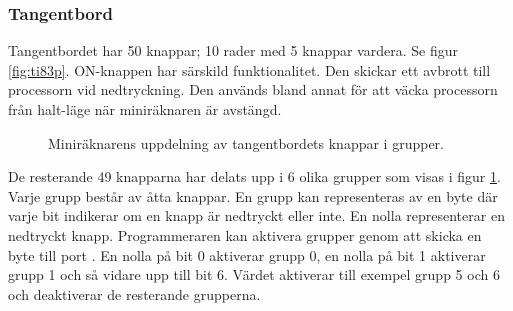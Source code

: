 \documentclass[main.tex]{subfiles}
\begin{document}
\subsubsection{Tangentbord}
Tangentbordet har 50 knappar; 10 rader med 5 knappar vardera. Se figur
\ref{fig:ti83p}. ON-knappen har särskild funktionalitet. Den skickar ett
avbrott till processorn vid nedtryckning. Den används bland annat för att väcka
processorn från halt-läge när miniräknaren är avstängd.

\begin{figure}
    \center
    \caption{Miniräknarens uppdelning av tangentbordets knappar i grupper.}
    \label{fig:keygroups}
\end{figure}

De resterande 49 knapparna har delats upp i 6 olika grupper som visas i figur
\ref{fig:keygroups}. Varje grupp består av åtta knappar. En grupp kan
representeras av en byte där varje bit indikerar om en knapp är nedtryckt eller
inte. En nolla representerar en nedtryckt knapp. Programmeraren kan aktivera
grupper genom att skicka en byte till port . En nolla på bit 0
aktiverar grupp 0, en nolla på bit 1 aktiverar grupp 1 och så vidare upp till
bit 6. Värdet  aktiverar till exempel grupp 5 och 6 och
deaktiverar de resterande grupperna.
\end{document}

